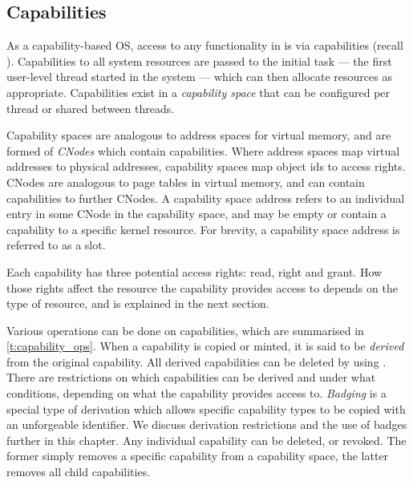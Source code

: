 \subsection{Capabilities}
\label{s:capabilities}

As a capability-based \gls{OS}, access to any functionality in \selfour is via capabilities (recall
). Capabilities to all system resources are passed to the initial task --- the first
user-level thread started in the system --- which can then allocate resources as appropriate.
Capabilities exist in a \emph{capability space} that can be configured per thread or shared between
threads. 

Capability spaces are analogous to address spaces for virtual memory, and are formed of
\emph{CNodes} which contain capabilities. Where address spaces map virtual addresses to physical
addresses, capability spaces map object ids to access rights.  CNodes are analogous to page tables
in virtual memory, and can contain capabilities to further CNodes. A capability space address refers
to an individual entry in some CNode in the capability space, and may be empty or contain a
capability to a specific kernel resource. For brevity, a capability space address is referred to as
a slot. 

Each capability has three potential access rights: read, right and grant. How those rights affect
the resource the capability provides access to depends on the type of resource, and is explained in
the next section.

Various operations can be done on capabilities, which are summarised in \cref{t:capability_ops}.
When a capability is copied or minted, it is said to be \emph{derived} from the original capability.
All derived capabilities can be deleted by using .
There are restrictions on which capabilities can be derived and under what conditions, depending on
what the capability provides access to. 
\emph{Badging} is a special type of derivation which allows specific capability types to be copied
with an unforgeable identifier. We discuss derivation restrictions and the use of badges further
in this chapter.
Any individual capability can be deleted, or revoked. The former simply removes a specific
capability from a capability space, the latter removes all child capabilities.

